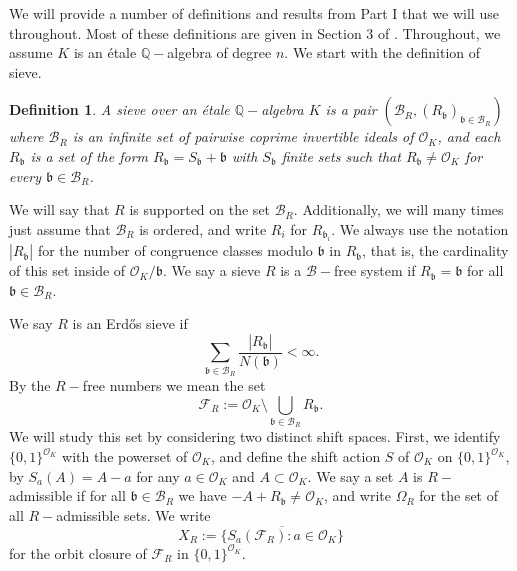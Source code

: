 \documentclass[a4paper,11pt,reqno]{amsart}
\theoremstyle{plain}
\newtheorem{definition}[theorem]{Definition}
\theoremstyle{remark}
\newcommand{\q}{\mathbb{Q}}
\newcommand{\cb}{\mathcal{B}}
\newcommand{\co}{\mathcal{O}}
\newcommand{\fr}{\mathcal{F}_R}
\newcommand{\gb}{\mathfrak{b}}
\begin{document}
We will provide a number of definitions and results from Part I that we will use throughout. Most of these definitions are given in Section 3 of \cite{part1}. Throughout, we assume $K$ is an étale $\q-$algebra of degree $n$. We start with the definition of sieve.

\begin{definition}
	\label{def: Sieve}
	A sieve over an étale $\q-$algebra $K$ is a pair $(\cb_R,(R_\gb)_{\gb \in \cb_R})$ where $\cb_R$ is an infinite set of pairwise coprime invertible ideals of $\co_K$, and each $R_\gb$ is a set of the form $R_\gb =  S_\gb + \gb $ with $S_\gb$ finite sets such that $R_\gb \neq \co_K$ for every $\gb \in \cb_R$.
\end{definition}

We will say that $R$ is supported on the set $\cb_R$. Additionally, we will many times just assume that $\cb_R$ is ordered, and write $R_i$ for $R_{\gb_i}$. We always use the notation $|R_\gb|$ for the number of congruence classes modulo $\gb$ in $R_\gb$, that is, the cardinality of this set inside of $\co_K/\gb$. We say a sieve $R$ is a $\cb-$free system if $R_\gb = \gb$ for all $\gb \in \cb_R$.


 We say $R$ is an Erdős sieve if $$\sum_{\gb \in \cb_R} \frac{|R_\gb|}{N(\gb)} < \infty.$$ By the $R-$free numbers we mean the set $$\fr := \co_K\setminus\bigcup_{\gb \in \cb_R} R_\gb.$$ We will study this set by considering two distinct shift spaces. First, we identify $\{0,1\}^{\co_K}$ with the powerset of $\co_K$, and define the shift action $S$ of $\co_K$ on $\{0,1\}^{\co_K}$, by $S_a(A) = A-a$ for any $a\in \co_K$ and $A \subset \co_K$. We say a set $A$ is $R-$admissible if for all $\gb \in \cb_R$ we have $-A+R_\gb \neq \co_K$, and write $\Omega_{R}$ for the set of all $R-$admissible sets. We write $$X_R := \overline{\{S_a(\fr):a \in \co_K\}}$$ for the orbit closure of $\fr$ in $\{0,1\}^{\co_K}$. 
\end{document}
